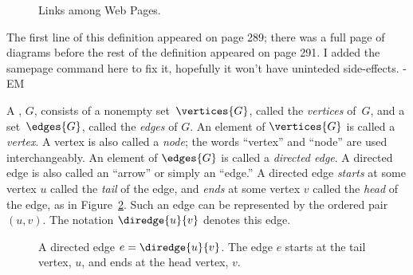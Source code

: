 \iffalse

and in the following graph the vertices $x_1, \ldots, x_n$ correspond
to web pages and $\diredge{x_i}{x_j}$ is a directed edge when page
$x_i$ contains a hyperlink to page $x_j$.
\fi


\begin{figure}


\caption{Links among Web Pages.}

\label{webpage-links}

\end{figure}
\begin{editingnotes}

The first line of this definition appeared on page 289; there was a
full page of diagrams before the rest of the definition appeared on
page 291. I added the samepage command here to fix it, hopefully it
won't have uninteded side-effects. -EM
\end{editingnotes}

\begin{samepage}
\begin{definition}\label{graphdef}
  A , $G$, consists of a nonempty
  set~$\vertices{G}$, called the \emph{vertices}%
of~$G$, and a set~$\edges{G}$, called the \emph{edges}%
of $G$.  An element of
  $\vertices{G}$ is called a \emph{vertex}.  A vertex is also called a
  \emph{node}; the words ``vertex'' and ``node'' are used
  interchangeably.  An element of $\edges{G}$ is called a
  \emph{directed edge}.  A directed edge is also called an ``arrow''
  or simply an ``edge.''  A directed edge \emph{starts} 
at some vertex $u$ called the \emph{tail}
  of the edge, and \emph{ends} at some vertex
  $v$ called the \emph{head} of the edge, as in Figure~\ref{fig:6EA}.
  Such an edge can be represented by the ordered pair $(u,v)$.  The
  notation $\diredge{u}{v}$ denotes this edge.
\end{definition}
\end{samepage}

\begin{figure}


\caption{A directed edge $e = \diredge{u}{v}$.  The edge $e$ starts at
  the tail vertex, $u$, and ends at the head vertex, $v$.}

\label{fig:6EA}
\end{figure}

